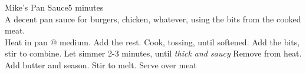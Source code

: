 \documentclass[a6paper,landscape]{article}
\begin{document}
\begin{recipe}{Mike's Pan Sauce}{5 minutes}{}
  \freeform \\A decent pan sauce for burgers, chicken, whatever, using the bits from the cooked meat.\\
  Heat in pan @ medium. Add the rest. Cook, tossing, until softened.
  Add the bits, stir to combine. Let simmer 2-3 minutes, until \textit{thick and saucy}
  Remove from heat. Add butter and season. Stir to melt.
  \newstep Serve over meat

  \end{recipe}
\end{document}
